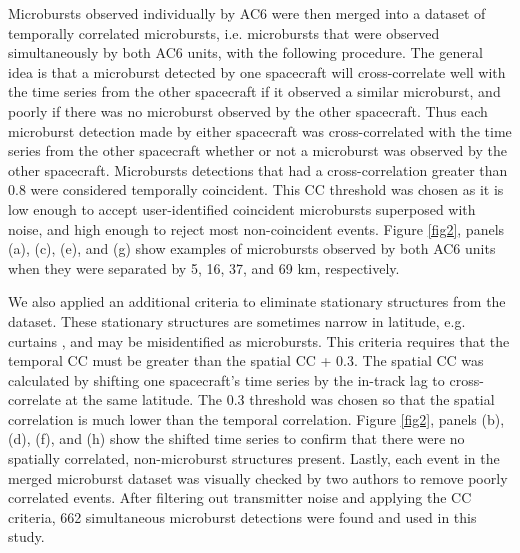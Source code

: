 \documentclass[draft]{agujournal2019}
\begin{document}
Microbursts observed individually by AC6 were then merged into a dataset of temporally correlated microbursts, i.e. microbursts that were observed simultaneously by both AC6 units, with the following procedure. The general idea is that a microburst detected by one spacecraft will cross-correlate well with the time series from the other spacecraft if it observed a similar microburst, and poorly if there was no microburst observed by the other spacecraft. Thus each microburst detection made by either spacecraft was cross-correlated with the time series from the other spacecraft whether or not a microburst was observed by the other spacecraft.  Microbursts detections that had a cross-correlation greater than $0.8$ were considered temporally coincident. This CC threshold was chosen as it is low enough to accept user-identified coincident microbursts superposed with noise, and high enough to reject most non-coincident events. Figure \ref{fig2}, panels (a), (c), (e), and (g) show examples of microbursts observed by both AC6 units when they were separated by 5, 16, 37, and 69 km, respectively. 

We also applied an additional criteria to eliminate stationary structures from the dataset. These stationary structures are sometimes narrow in latitude, e.g. curtains \cite{Blake2016}, and may be misidentified as microbursts. This criteria requires that the temporal CC must be greater than the spatial CC + 0.3. The spatial CC was calculated by shifting one spacecraft's time series by the in-track lag to cross-correlate at the same latitude. The 0.3 threshold was chosen so that the spatial correlation is much lower than the temporal correlation. Figure \ref{fig2}, panels (b), (d), (f), and (h) show the shifted time series to confirm that there were no spatially correlated, non-microburst structures present. Lastly, each event in the merged microburst dataset was visually checked by two authors to remove poorly correlated events. After filtering out transmitter noise and applying the CC criteria, 662 simultaneous microburst detections were found and used in this study.
\end{document}
